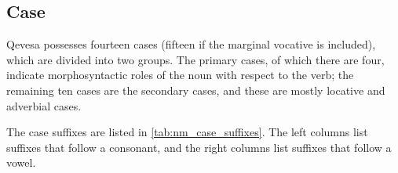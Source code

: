 \documentclass[grammar]{subfiles}
\begin{document}
%

  \subsection{Case}
  \label{ssec:nm_case}

  Qevesa possesses fourteen cases (fifteen if the marginal vocative is
  included), which are divided into two groups.  The primary cases, of which
  there are four, indicate morphosyntactic roles of the noun with respect to
  the verb; the remaining ten cases are the secondary cases, and these are
  mostly locative and adverbial cases. 

  The case suffixes are listed in \cref{tab:nm_case_suffixes}.  The left
  columns list suffixes that follow a consonant, and the right columns list
  suffixes that follow a vowel.  
\end{document}
